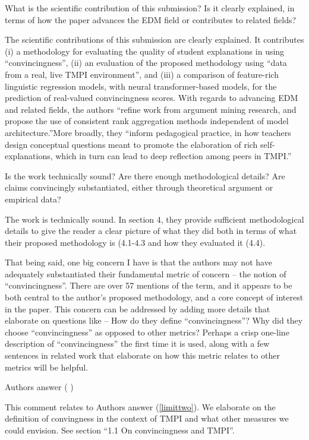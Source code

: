 \documentclass[notitlepage,12pt]{article}
\makeatletter
\newcounter{answ}
\newcommand{\customlabel}[2]{%
\protected@write \@auxout {}{\string \newlabel {#1}{{#2}{}}}}
\makeatother
\begin{document}
    \begin{revcomment}{What is the scientific contribution of this submission? Is it clearly explained, in terms of how the paper advances the EDM field or contributes to related fields?}

    The scientific contributions of this submission are clearly explained. It contributes (i) a methodology for evaluating the quality of student explanations in using “convincingness”, (ii) an evaluation of the proposed methodology using “data from a real, live TMPI environment”, and (iii) a comparison of feature-rich linguistic regression models, with neural transformer-based models, for the prediction of real-valued convincingness scores. With regards to advancing EDM and related fields, the authors “refine work from argument mining research, and propose the use of consistent rank aggregation methods independent of model architecture.”More broadly, they “inform pedagogical practice, in how teachers design conceptual questions meant to promote the elaboration of rich self-explanations, which in turn can lead to deep reflection among peers in TMPI.”
    \end{revcomment}

    \begin{revcomment}{Is the work technically sound? Are there enough methodological details? Are claims convincingly substantiated, either through theoretical argument or empirical data?}

    The work is technically sound. In section 4, they provide sufficient methodological details to give the reader a clear picture of what they did both in terms of what their proposed methodology is (4.1-4.3 and how they evaluated it (4.4).

    That being said, one big concern I have is that the authors may not have adequately substantiated their fundamental metric of concern -- the notion of “convincingness”. There are over 57 mentions of the term, and it appears to be both central to the author’s proposed methodology, and a core concept of interest in the paper. This concern can be addressed by adding more details that elaborate on questions like -- How do they define “convincingness”? Why did they choose “convincingness” as opposed to other metrics? Perhaps a crisp one-line description of “convincingness” the first time it is used, along with a few sentences in related work that elaborate on how this metric relates to other metrics will be helpful.

    \begin{authorstwo}{Authors answer (\textt{\theansw}\customlabel{limitthree}{\textt{\theansw}})}

      This comment relates to Authors answer (\ref{limittwo}).  We elaborate on the definition of convingness in the context of TMPI and what other measures we could envision.  See section ``1.1 On convincingness and TMPI''.

    \end{authorstwo}

    \end{revcomment}
\end{document}
